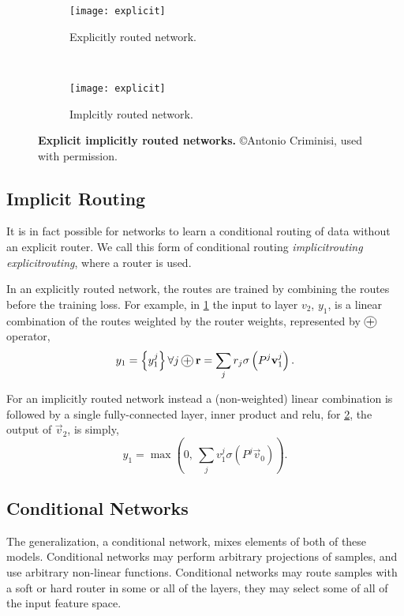 \documentclass[thesis]{subfiles}
\begin{document}
	
	\begin{figure}[tbp] 
		\centering
		\begin{subfigure}[b]{0.45\textwidth}
			\centering
			\texttt{[image: explicit]}
			\caption{Explicitly routed network.}\label{fig:explicitRouter}
		\end{subfigure}
		~
		\begin{subfigure}[b]{0.45\textwidth}
			\centering
			\texttt{[image: explicit]}
			\caption{Implcitly routed network.}\label{fig:implicitRouter}
		\end{subfigure}
		\caption[Explicit \vs{}implicitly routed networks]{\textbf{Explicit \vs{}implicitly routed networks.} \copyright Antonio Criminisi, used with permission.}\label{fig:routerConnections}
	\end{figure}
	
	\subsection{Implicit Routing}
	It is in fact possible for networks to learn a conditional routing of data without an explicit router. We call this form of conditional routing \emph{\gls{implicitrouting}} \vs \emph{\gls{explicitrouting}}, where a router is used. 
	
	In an explicitly routed network, the routes are trained by combining the routes before the training loss. For example, in \cref{fig:explicitRouter} the input to layer $v_2$, $y_1$, is a linear combination of the routes weighted by the router weights, represented by $\circleplus$ operator,
	\begin{equation}
	y_1 = \left\{y_1^j\right\} \forall j\circleplus \vec r = \sum_j r_j \sigma\left(P^j \vec v_1^j \right).
	\end{equation}
	
	For an implicitly routed network instead a (non-weighted) linear combination is followed by a single fully-connected layer, \ie inner product and \gls{relu}, \ie for \cref{fig:implicitRouter}, the output of $\vec v_2$, is simply,
	\begin{equation}
	y_1 = \max \left(0, ~\sum_j v_1^j \sigma(P^j \vec v_0) \right).
	\end{equation}
	
	\subsection{Conditional Networks}
	The generalization, a conditional network, mixes elements of both of these models. Conditional networks may perform arbitrary projections of samples, and use arbitrary non-linear functions. Conditional networks may route samples with a soft or hard router in some or all of the layers, they may select some of all of the input feature space. 
	
\end{document}
